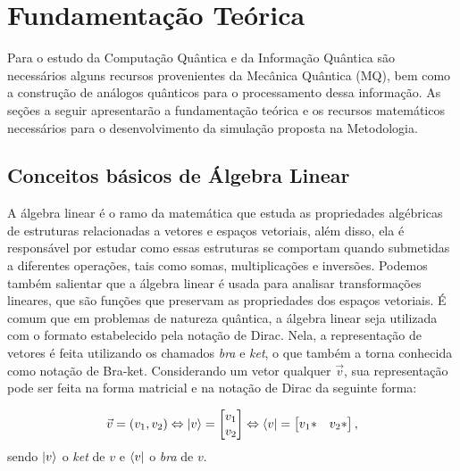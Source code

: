 
\chapter{Fundamentação Teórica}

Para o estudo da Computação Quântica e da Informação Quântica são necessários alguns recursos provenientes da Mecânica Quântica (MQ), bem como a construção de análogos quânticos para o processamento dessa informação. As seções a seguir apresentarão a fundamentação teórica e os recursos matemáticos necessários para o desenvolvimento da simulação proposta na Metodologia.

\section{Conceitos básicos de Álgebra Linear}\label{sec:algelin}

A álgebra linear é o ramo da matemática que estuda as propriedades algébricas de estruturas relacionadas a vetores e espaços vetoriais, além disso, ela é responsável por estudar como essas estruturas se comportam quando submetidas a diferentes operações, tais como somas, multiplicações e inversões. Podemos também salientar que a álgebra linear é usada para analisar transformações lineares, que são funções que preservam as propriedades dos espaços vetoriais. É comum que em problemas de natureza quântica, a álgebra linear seja utilizada com o formato estabelecido pela notação de Dirac. Nela, a representação de vetores é feita utilizando os chamados \textit{bra} e \textit{ket}, o que também a torna conhecida como notação de Bra-ket. Considerando um vetor qualquer \textit{$\vec{v}$}, sua representação pode ser feita na forma matricial e na notação de Dirac da seguinte forma:

\begin{equation}
\vec{v}= (v_1, v_2) \Leftrightarrow \ket{v} = \begin{bmatrix} v_1 \\ v_2 \end{bmatrix} \Leftrightarrow \bra{v} = \begin{bmatrix}
v_1* & v_2* \end{bmatrix},
\end{equation}
sendo $\ket{v}$ o \textit{ket} de $v$ e $\bra{v}$ o \textit{bra} de $v$. 

